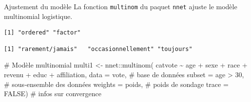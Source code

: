 \documentclass[
  ignorenonframetext,
]{beamer}
\newenvironment{Shaded}{\begin{snugshade}}{\end{snugshade}}
\newcommand{\AttributeTok}[1]{\textcolor[rgb]{0.40,0.45,0.13}{#1}}
\newcommand{\CommentTok}[1]{\textcolor[rgb]{0.37,0.37,0.37}{#1}}
\newcommand{\ConstantTok}[1]{\textcolor[rgb]{0.56,0.35,0.01}{#1}}
\newcommand{\DecValTok}[1]{\textcolor[rgb]{0.68,0.00,0.00}{#1}}
\newcommand{\FunctionTok}[1]{\textcolor[rgb]{0.28,0.35,0.67}{#1}}
\newcommand{\NormalTok}[1]{\textcolor[rgb]{0.00,0.23,0.31}{#1}}
\newcommand{\OtherTok}[1]{\textcolor[rgb]{0.00,0.23,0.31}{#1}}
\newcommand{\SpecialCharTok}[1]{\textcolor[rgb]{0.37,0.37,0.37}{#1}}
\newcommand{\StringTok}[1]{\textcolor[rgb]{0.13,0.47,0.30}{#1}}
\begin{document}
\begin{frame}[fragile]{Ajustement du modèle}
\label{ajustement-du-moduxe8le}
La fonction \texttt{multinom} du paquet \texttt{nnet} ajuste le modèle
multinomial logistique.

\begin{Shaded}
\end{Shaded}

\begin{verbatim}
[1] "ordered" "factor" 
\end{verbatim}

\begin{Shaded}
\end{Shaded}

\begin{verbatim}
[1] "rarement/jamais"   "occasionnellement" "toujours"         
\end{verbatim}

\begin{Shaded}
\begin{Highlighting}[numbers=left,,]
\CommentTok{\# Modèle multinomial}
\NormalTok{multi1 }\OtherTok{\textless{}{-}}\NormalTok{ nnet}\SpecialCharTok{::}\FunctionTok{multinom}\NormalTok{(}
\NormalTok{  catvote }\SpecialCharTok{\textasciitilde{}}\NormalTok{ age }\SpecialCharTok{+}\NormalTok{ sexe }\SpecialCharTok{+}\NormalTok{ race }\SpecialCharTok{+}\NormalTok{ revenu }\SpecialCharTok{+} 
\NormalTok{    educ }\SpecialCharTok{+}\NormalTok{ affiliation, }
  \AttributeTok{data =}\NormalTok{ vote,       }\CommentTok{\# base de données}
  \AttributeTok{subset =}\NormalTok{ age }\SpecialCharTok{\textgreater{}} \DecValTok{30}\NormalTok{, }\CommentTok{\# sous{-}ensemble des données}
  \AttributeTok{weights =}\NormalTok{ poids,   }\CommentTok{\# poids de sondage}
  \AttributeTok{trace =} \ConstantTok{FALSE}\NormalTok{)     }\CommentTok{\# infos sur convergence}
\end{Highlighting}
\end{Shaded}
\end{frame}
\end{document}
